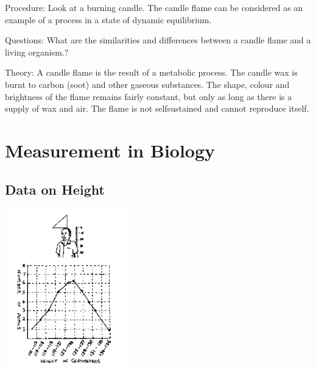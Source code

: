 \begin{multicols}{2}
\begin{description*}
\item[Procedure:]{Look at a burning candle. The candle flame can be considered as an example of a process
in a state of dynamic equilibrium.}
\item[Questions:]{What are the similarities and differences between a candle flame and a living organism.?}
\item[Theory:]{A candle flame is the result of a metabolic process. The candle wax is burnt to carbon
(soot) and other gaseous substances. The shape, colour and brightness of the flame remains
fairly constant, but only as long as there is a supply of wax and air. The flame is not selfsustained
and cannot reproduce itself.}
\end{description*}


\section*{Measurement in Biology}


\subsection{Data on Height} %

\begin{center}
\includegraphics[width=0.4\textwidth]{./img/source/data-height.png}
\end{center}


\end{multicols}
